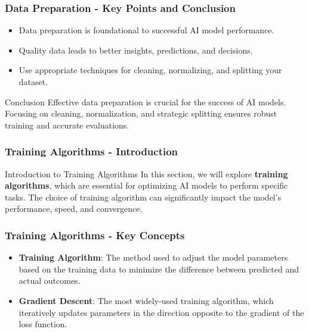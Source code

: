 \documentclass[aspectratio=169]{beamer}
\begin{document}
\begin{frame}[fragile]
    \frametitle{Data Preparation - Key Points and Conclusion}
    \begin{itemize}
        \item Data preparation is foundational to successful AI model performance.
        \item Quality data leads to better insights, predictions, and decisions.
        \item Use appropriate techniques for cleaning, normalizing, and splitting your dataset.
    \end{itemize}
    
    \begin{block}{Conclusion}
        Effective data preparation is crucial for the success of AI models. Focusing on cleaning, normalization, and strategic splitting ensures robust training and accurate evaluations.
    \end{block}
\end{frame}

\begin{frame}
    \frametitle{Training Algorithms - Introduction}
    \begin{block}{Introduction to Training Algorithms}
        In this section, we will explore \textbf{training algorithms}, which are essential for optimizing AI models to perform specific tasks. The choice of training algorithm can significantly impact the model's performance, speed, and convergence.
    \end{block}
\end{frame}

\begin{frame}
    \frametitle{Training Algorithms - Key Concepts}
    \begin{itemize}
        \item \textbf{Training Algorithm}: The method used to adjust the model parameters based on the training data to minimize the difference between predicted and actual outcomes.
        \item \textbf{Gradient Descent}: The most widely-used training algorithm, which iteratively updates parameters in the direction opposite to the gradient of the loss function.
    \end{itemize}
\end{frame}
\end{document}

